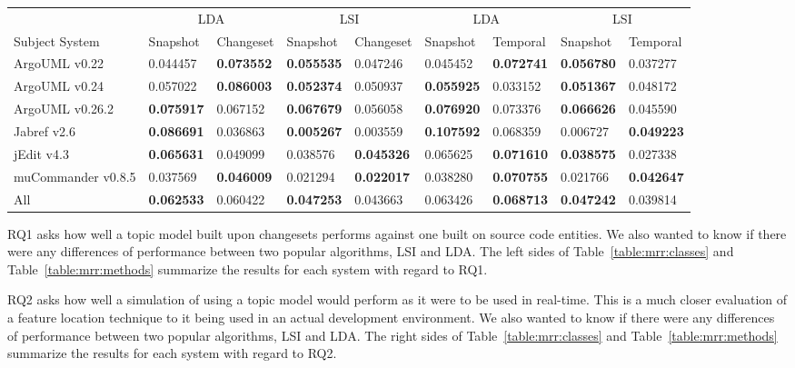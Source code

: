\begin{table*}[ht]
\renewcommand{\arraystretch}{1.3}
\footnotesize
\centering
\caption{MRR of subject systems methods}
\begin{tabular}{l|ll|ll||ll|ll}
    \toprule
                        & \multicolumn{2}{c|}{LDA}      &  \multicolumn{2}{c||}{LSI}    & \multicolumn{2}{c|}{LDA}      &  \multicolumn{2}{c}{LSI}  \\
    Subject System      & Snapshot      & Changeset     & Snapshot      & Changeset     & Snapshot      & Temporal      & Snapshot      & Temporal  \\
    \midrule
ArgoUML v0.22 & 0.044457 & {\bf 0.073552 } & {\bf 0.055535 } & 0.047246 & 0.045452 & {\bf 0.072741 } & {\bf 0.056780 } & 0.037277 \\
ArgoUML v0.24 & 0.057022 & {\bf 0.086003 } & {\bf 0.052374 } & 0.050937 & {\bf 0.055925 } & 0.033152 & {\bf 0.051367 } & 0.048172 \\
ArgoUML v0.26.2 & {\bf 0.075917 } & 0.067152 & {\bf 0.067679 } & 0.056058 & {\bf 0.076920 } & 0.073376 & {\bf 0.066626 } & 0.045590 \\
Jabref v2.6 & {\bf 0.086691 } & 0.036863 & {\bf 0.005267 } & 0.003559 & {\bf 0.107592 } & 0.068359 & 0.006727 & {\bf 0.049223 } \\
jEdit v4.3 & {\bf 0.065631 } & 0.049099 & 0.038576 & {\bf 0.045326 } & 0.065625 & {\bf 0.071610 } & {\bf 0.038575 } & 0.027338 \\
muCommander v0.8.5 & 0.037569 & {\bf 0.046009 } & 0.021294 & {\bf 0.022017 } & 0.038280 & {\bf 0.070755 } & 0.021766 & {\bf 0.042647 } \\
    \midrule
All & {\bf 0.062533 } & 0.060422 & {\bf 0.047253 } & 0.043663 & 0.063426 & {\bf 0.068713 } & {\bf 0.047242 } & 0.039814 \\
    \bottomrule
\end{tabular}
\label{table:mrr:methods}
\end{table*}





RQ1 asks how well a topic model built upon changesets performs against
one built on source code entities.
We also wanted to know if there were any differences of performance
between two popular algorithms, LSI and LDA.
The left sides of Table~\ref{table:mrr:classes} and Table~\ref{table:mrr:methods}
summarize the results for each system with regard to RQ1.

RQ2 asks how well a simulation of using a topic model would perform as
it were to be used in real-time.
This is a much closer evaluation of a feature location technique to it
being used in an actual development environment.
We also wanted to know if there were any differences of performance
between two popular algorithms, LSI and LDA.
The right sides of Table~\ref{table:mrr:classes} and Table~\ref{table:mrr:methods}
summarize the results for each system with regard to RQ2.

